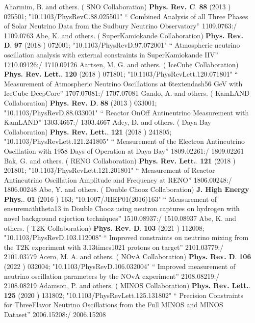 \documentclass{article}
\begin{document}
\begin{thebibliography}{99}
  Aharmim, B. and others. ( SNO Collaboration) {\bf  Phys. Rev. C}. {\bf  88} (2013 )  025501;  "10.1103/PhysRevC.88.025501" `` Combined Analysis of all Three Phases of Solar Neutrino Data from the Sudbury Neutrino Observatory'' 1109.0763:/ 1109.0763
  Abe, K. and others. ( SuperKamiokande Collaboration) {\bf  Phys. Rev. D}. {\bf  97} (2018 )  072001;  "10.1103/PhysRevD.97.072001" `` Atmospheric neutrino oscillation analysis with external constraints in SuperKamiokande IIV'' 1710.09126:/ 1710.09126
  Aartsen, M. G. and others. ( IceCube Collaboration) {\bf  Phys. Rev. Lett.}. {\bf  120} (2018 )  071801;  "10.1103/PhysRevLett.120.071801" `` Measurement of Atmospheric Neutrino Oscillations at 6textendash56 GeV with IceCube DeepCore'' 1707.07081:/ 1707.07081
  Gando, A. and others. ( KamLAND Collaboration) {\bf  Phys. Rev. D}. {\bf  88} (2013 )  033001;  "10.1103/PhysRevD.88.033001" `` Reactor OnOff Antineutrino Measurement with KamLAND'' 1303.4667:/ 1303.4667
  Adey, D. and others. ( Daya Bay Collaboration) {\bf  Phys. Rev. Lett.}. {\bf  121} (2018 )  241805;  "10.1103/PhysRevLett.121.241805" `` Measurement of the Electron Antineutrino Oscillation with 1958 Days of Operation at Daya Bay'' 1809.02261:/ 1809.02261
  Bak, G. and others. ( RENO Collaboration) {\bf  Phys. Rev. Lett.}. {\bf  121} (2018 )  201801;  "10.1103/PhysRevLett.121.201801" `` Measurement of Reactor Antineutrino Oscillation Amplitude and Frequency at RENO'' 1806.00248:/ 1806.00248
  Abe, Y. and others. ( Double Chooz Collaboration) {\bf  J. High Energy Phys.}. {\bf  01} (2016 )  163;  "10.1007/JHEP01(2016)163" `` Measurement of ensuremaththeta13 in Double Chooz using neutron captures on hydrogen with novel background rejection techniques'' 1510.08937:/ 1510.08937
  Abe, K. and others. ( T2K Collaboration) {\bf  Phys. Rev. D}. {\bf  103} (2021 )  112008;  "10.1103/PhysRevD.103.112008" `` Improved constraints on neutrino mixing from the T2K experiment with 3.13times1021 protons on target'' 2101.03779:/ 2101.03779
  Acero, M. A. and others. ( NOvA Collaboration) {\bf  Phys. Rev. D}. {\bf  106} (2022 )  032004;  "10.1103/PhysRevD.106.032004" `` Improved measurement of neutrino oscillation parameters by the NOvA experiment'' 2108.08219:/ 2108.08219
  Adamson, P. and others. ( MINOS Collaboration) {\bf  Phys. Rev. Lett.}. {\bf  125} (2020 )  131802;  "10.1103/PhysRevLett.125.131802" `` Precision Constraints for ThreeFlavor Neutrino Oscillations from the Full MINOS and MINOS Dataset'' 2006.15208:/ 2006.15208

\end{thebibliography}
\end{document}
